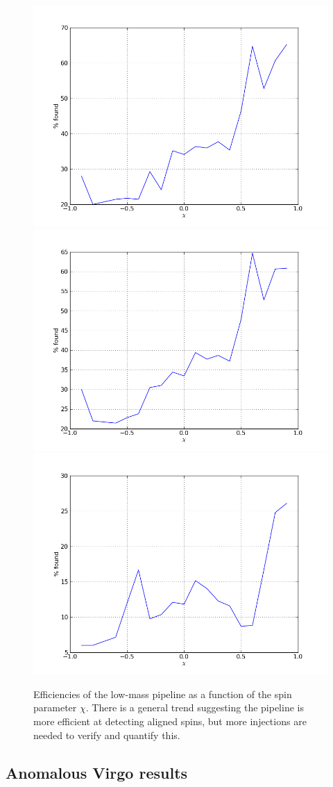 \begin{figure}
  \includegraphics[width=0.5\linewidth]{figures/ninja2_results/H_second_spin_low_efficiency}
  \includegraphics[width=0.5\linewidth]{figures/ninja2_results/L_second_spin_low_efficiency} \\
  \includegraphics[width=0.5\linewidth]{figures/ninja2_results/V_second_spin_low_efficiency}
  \caption[Efficiency of the low-mass pipeline as a function of spin]{
  \label{f:low_spin_efficiencies}
Efficiencies of the low-mass pipeline as a function of the spin
parameter $\chi$.  There is a general trend suggesting the pipeline
is more efficient at detecting aligned spins, but more injections are
needed to verify and quantify this.
}
\end{figure}%


\subsection{Anomalous Virgo results}
\label{ssec:virgo_anomaly}

